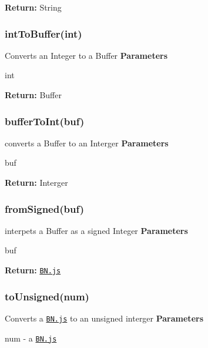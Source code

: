 {\bfseries Return\+:} {\ttfamily String}

\subsubsection*{{\ttfamily int\+To\+Buffer(int)}}

Converts an {\ttfamily Integer} to a {\ttfamily Buffer} {\bfseries Parameters}
\begin{DoxyItemize}
\item {\ttfamily int}
\end{DoxyItemize}

{\bfseries Return\+:} {\ttfamily Buffer}

\subsubsection*{{\ttfamily buffer\+To\+Int(buf)}}

converts a {\ttfamily Buffer} to an {\ttfamily Interger} {\bfseries Parameters}
\begin{DoxyItemize}
\item {\ttfamily buf}
\end{DoxyItemize}

{\bfseries Return\+:} {\ttfamily Interger}

\subsubsection*{{\ttfamily from\+Signed(buf)}}

interpets a {\ttfamily Buffer} as a signed {\ttfamily Integer} {\bfseries Parameters}
\begin{DoxyItemize}
\item {\ttfamily buf}
\end{DoxyItemize}

{\bfseries Return\+:} \href{https://github.com/indutny/bn.js}{\tt {\ttfamily B\+N.\+js}}

\subsubsection*{{\ttfamily to\+Unsigned(num)}}

Converts a \href{https://github.com/indutny/bn.js}{\tt {\ttfamily B\+N.\+js}} to an unsigned interger {\bfseries Parameters}
\begin{DoxyItemize}
\item {\ttfamily num} -\/ a \href{https://github.com/indutny/bn.js}{\tt {\ttfamily B\+N.\+js}}
\end{DoxyItemize}

